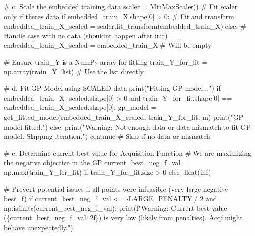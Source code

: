 \documentclass[
  letterpaper,
  DIV=11,
  numbers=noendperiod]{scrartcl}
\newenvironment{Shaded}{\begin{snugshade}}{\end{snugshade}}
\newcommand{\BuiltInTok}[1]{\textcolor[rgb]{0.00,0.23,0.31}{#1}}
\newcommand{\CommentTok}[1]{\textcolor[rgb]{0.37,0.37,0.37}{#1}}
\newcommand{\ControlFlowTok}[1]{\textcolor[rgb]{0.00,0.23,0.31}{#1}}
\newcommand{\DecValTok}[1]{\textcolor[rgb]{0.68,0.00,0.00}{#1}}
\newcommand{\KeywordTok}[1]{\textcolor[rgb]{0.00,0.23,0.31}{#1}}
\newcommand{\NormalTok}[1]{\textcolor[rgb]{0.00,0.23,0.31}{#1}}
\newcommand{\OperatorTok}[1]{\textcolor[rgb]{0.37,0.37,0.37}{#1}}
\newcommand{\SpecialCharTok}[1]{\textcolor[rgb]{0.37,0.37,0.37}{#1}}
\newcommand{\SpecialStringTok}[1]{\textcolor[rgb]{0.13,0.47,0.30}{#1}}
\newcommand{\StringTok}[1]{\textcolor[rgb]{0.13,0.47,0.30}{#1}}
\begin{document}
\begin{Shaded}
\begin{Highlighting}[]
    \CommentTok{\# c. Scale the embedded training data}
\NormalTok{    scaler }\OperatorTok{=}\NormalTok{ MinMaxScaler()}
    \CommentTok{\# Fit scaler only if there\textquotesingle{}s data}
    \ControlFlowTok{if}\NormalTok{ embedded\_train\_X.shape[}\DecValTok{0}\NormalTok{] }\OperatorTok{\textgreater{}} \DecValTok{0}\NormalTok{:}
        \CommentTok{\# Fit and transform}
\NormalTok{        embedded\_train\_X\_scaled }\OperatorTok{=}\NormalTok{ scaler.fit\_transform(embedded\_train\_X)}
    \ControlFlowTok{else}\NormalTok{:}
        \CommentTok{\# Handle case with no data (shouldn\textquotesingle{}t happen after init)}
\NormalTok{        embedded\_train\_X\_scaled }\OperatorTok{=}\NormalTok{ embedded\_train\_X }\CommentTok{\# Will be empty}

    \CommentTok{\# Ensure train\_Y is a NumPy array for fitting}
\NormalTok{    train\_Y\_for\_fit }\OperatorTok{=}\NormalTok{ np.array(train\_Y\_list) }\CommentTok{\# Use the list directly}

    \CommentTok{\# d. Fit GP Model using SCALED data}
    \BuiltInTok{print}\NormalTok{(}\StringTok{"Fitting GP model..."}\NormalTok{)}
    \ControlFlowTok{if}\NormalTok{ embedded\_train\_X\_scaled.shape[}\DecValTok{0}\NormalTok{] }\OperatorTok{\textgreater{}} \DecValTok{0} \KeywordTok{and}\NormalTok{ train\_Y\_for\_fit.shape[}\DecValTok{0}\NormalTok{] }\OperatorTok{==}\NormalTok{ embedded\_train\_X\_scaled.shape[}\DecValTok{0}\NormalTok{]:}
\NormalTok{        gp\_model }\OperatorTok{=}\NormalTok{ get\_fitted\_model(embedded\_train\_X\_scaled, train\_Y\_for\_fit, m)}
        \BuiltInTok{print}\NormalTok{(}\StringTok{"GP model fitted."}\NormalTok{)}
    \ControlFlowTok{else}\NormalTok{:}
         \BuiltInTok{print}\NormalTok{(}\StringTok{"Warning: Not enough data or data mismatch to fit GP model. Skipping iteration."}\NormalTok{)}
         \ControlFlowTok{continue} \CommentTok{\# Skip if no data or mismatch}

    \CommentTok{\# e. Determine current best value for Acquisition Function}
    \CommentTok{\# We are maximizing the negative objective in the GP}
\NormalTok{    current\_best\_neg\_f\_val }\OperatorTok{=}\NormalTok{ np.}\BuiltInTok{max}\NormalTok{(train\_Y\_for\_fit) }\ControlFlowTok{if}\NormalTok{ train\_Y\_for\_fit.size }\OperatorTok{\textgreater{}} \DecValTok{0} \ControlFlowTok{else} \OperatorTok{{-}}\BuiltInTok{float}\NormalTok{(}\StringTok{\textquotesingle{}inf\textquotesingle{}}\NormalTok{)}

    \CommentTok{\# Prevent potential issues if all points were infeasible (very large negative best\_f)}
    \ControlFlowTok{if}\NormalTok{ current\_best\_neg\_f\_val }\OperatorTok{\textless{}=} \OperatorTok{{-}}\NormalTok{LARGE\_PENALTY }\OperatorTok{/} \DecValTok{2} \KeywordTok{and}\NormalTok{ np.isfinite(current\_best\_neg\_f\_val):}
         \BuiltInTok{print}\NormalTok{(}\SpecialStringTok{f"Warning: Current best value (}\SpecialCharTok{\{}\NormalTok{current\_best\_neg\_f\_val}\SpecialCharTok{:.2f\}}\SpecialStringTok{) is very low (likely from penalties). Acqf might behave unexpectedly."}\NormalTok{)}



\end{Highlighting}
\end{Shaded}
\end{document}

